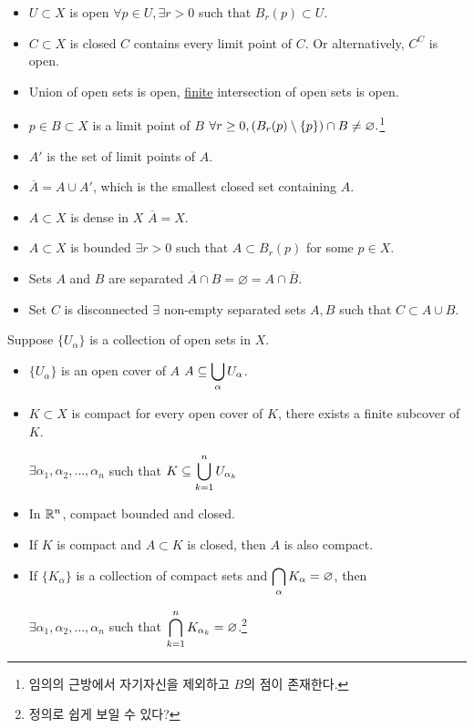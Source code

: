 \begin{itemize}
    \item \(U \subset X\) is open \miff \(\forall p \in U, \exists r > 0\) such that \(B_r(p) \subset U\).
    \item \(C \subset X\) is closed \miff \(C\) contains every limit point of \(C\). Or alternatively, \(C^C\) is open.
    \item Union of open sets is open, \underline{finite} intersection of open sets is open.
    \item \(p \in B \subset X\) is a limit point of \(B\) \miff \(\forall r \geq 0, \left(B_r(p) \setminus \{p\}\right) \cap B \neq \varnothing.\)\footnote{임의의 근방에서 자기자신을 제외하고 \(B\)의 점이 존재한다.}
    \item \(A'\) is the set of limit points of \(A\).
    \item \(\overline{A} = A \cup A'\), which is the smallest closed set containing \(A\).
    \item \(A \subset X\) is dense in \(X\) \miff \(\overline{A} = X\).
    \item \(A \subset X\) is bounded \miff \(\exists r > 0\) such that \(A \subset B_r(p)\) for some \(p \in X\).
    \item Sets \(A\) and \(B\) are separated \miff \(\overline{A}\cap B = \varnothing = A \cap \overline{B}\).
    \item Set \(C\) is disconnected \miff \(\exists\) non-empty separated sets \(A, B\) such that \(C \subset A\cup B\).
\end{itemize}

\medskip

Suppose \(\{U_\alpha\}\) is a collection of open sets in \(X\).

\begin{itemize}
    \item \(\{U_\alpha\}\) is an open cover of \(A\) \miff \(A \subseteq \displaystyle \bigcup_{\alpha} U_\alpha\).
    \item \(K \subset X\) is compact \miff for every open cover of \(K\), there exists a finite subcover of \(K\).
          \begin{center}
              \(\exists \alpha_1, \alpha_2, \dots, \alpha_n\) such that \(K \subseteq \displaystyle \bigcup_{k=1}^n U_{\alpha_k}\)
          \end{center}
    \item {} In \(\mathbb{R}^n\), compact \miff bounded and closed.
    \item If \(K\) is compact and \(A \subset K\) is closed, then \(A\) is also compact.
    \item If \(\{K_\alpha\}\) is a collection of compact sets and \(\displaystyle \bigcap_\alpha K_\alpha = \varnothing\), then
          \begin{center}
              \(\exists \alpha_1, \alpha_2, \dots, \alpha_n\) such that \(\displaystyle \bigcap_{k=1}^n K_{\alpha_k} = \varnothing\).\footnote{정의로 쉽게 보일 수 있다?}
          \end{center}
\end{itemize}

